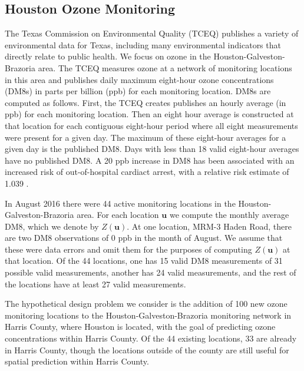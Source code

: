 \documentclass[cmbright]{staauth}
\begin{document}
\subsection{Houston Ozone Monitoring}\label{sec:houston}
The Texas Commission on Environmental Quality (TCEQ) publishes a variety of environmental data for Texas, including many environmental indicators that directly relate to public health. We focus on ozone in the Houston-Galveston-Brazoria area. The TCEQ measures ozone at a network of monitoring locations in this area and publishes daily maximum eight-hour ozone concentrations (DM8s) in parts per billion (ppb) for each monitoring location. DM8s are computed as follows. First, the TCEQ creates publishes an hourly average (in ppb) for each monitoring location. Then an eight hour average is constructed at that location for each contiguous eight-hour period where all eight measurements were present for a given day. The maximum of these eight-hour averages for a given day is the published DM8. Days with less than 18 valid eight-hour averages have no published DM8. A 20 ppb increase in DM8 has been associated with an increased risk of out-of-hospital cardiact arrest, with a relative risk estimate of 1.039 \citep[95\% CI (1.005, 1.073);][]{ensor2013case}.

In August 2016 there were 44 active monitoring locations in the Houston-Galveston-Brazoria area. For each location $\bm{u}$ we compute the monthly average DM8, which we denote by $Z(\bm{u})$. At one location, MRM-3 Haden Road, there are two DM8 observations of 0 ppb in the month of August. We assume that these were data errors and omit them for the purposes of computing $Z(\bm{u})$ at that location. Of the 44 locations, one has 15 valid DM8 measurements of 31 possible valid measurements, another has 24 valid measurements, and the rest of the locations have at least 27 valid measurements.

The hypothetical design problem we consider is the addition of 100 new ozone monitoring locations to the Houston-Galveston-Brazoria monitoring network in Harris County, where Houston is located, with the goal of predicting ozone concentrations within Harris County. Of the 44 existing locations, 33 are already in Harris County, though the locations outside of the county are still useful for spatial prediction within Harris County.
\end{document}
